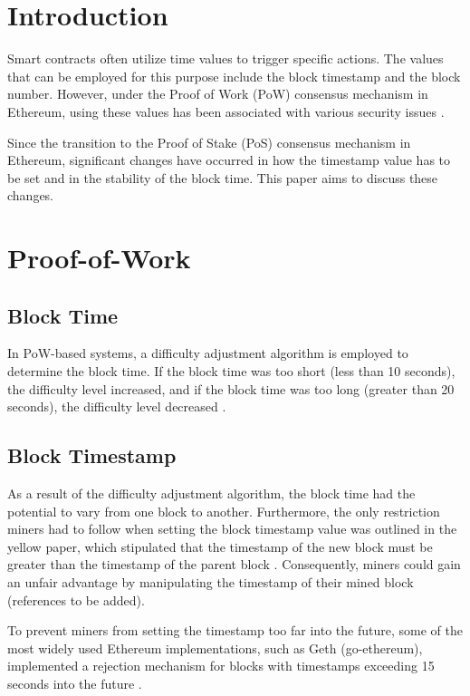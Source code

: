 \section{Introduction}

Smart contracts often utilize time values to trigger specific actions. The
values that can be employed for this purpose include the block timestamp and
the block number. However, under the Proof of Work (PoW) consensus mechanism in
Ethereum, using these values has been associated with various security issues
\cite{swc116} \cite{Conkas2021} \cite{DASP2018} \cite{Osiris2018}
\cite{Oyente2016}.


Since the transition to the Proof of Stake (PoS) consensus mechanism in
Ethereum, significant changes have occurred in how the timestamp value has to
be set and in the stability of the block time. This paper aims to discuss these
changes.

\section{Proof-of-Work}

\subsection{Block Time}

In PoW-based systems, a difficulty adjustment algorithm is employed to
determine the block time. If the block time was too short (less than 10
seconds), the difficulty level increased, and if the block time was too long
(greater than 20 seconds), the difficulty level decreased \cite{eip-2}.

\subsection{Block Timestamp}

As a result of the difficulty adjustment algorithm, the block time had the
potential to vary from one block to another. Furthermore, the only restriction
miners had to follow when setting the block timestamp value was outlined in the
yellow paper, which stipulated that the timestamp of the new block must be
greater than the timestamp of the parent block \cite{ethyellowpaper2023}.
Consequently, miners could gain an unfair advantage by manipulating the
timestamp of their mined block (references to be added).


To prevent miners from setting the timestamp too far into the future, some of the most widely used Ethereum implementations, such as Geth (go-ethereum), implemented a rejection mechanism for blocks with timestamps exceeding 15 seconds into the future \cite{go-ethereum-15-sek-limit}.

